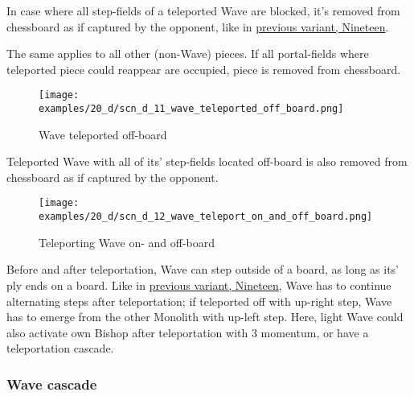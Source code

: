 In case where all step-fields of a teleported Wave are blocked, it's removed from
chessboard as if captured by the opponent, like in
\hyperref[fig:scn_n_06_teleport_wave_blocked]{previous variant, Nineteen}.

The same applies to all other (non-Wave) pieces. If all portal-fields where
teleported piece could reappear are occupied, piece is removed from chessboard.

\clearpage %

\noindent
\begin{figure}[!h]
\texttt{[image: examples/20\_d/scn\_d\_11\_wave\_teleported\_off\_board.png]}
\caption{Wave teleported off-board}
\label{fig:scn_d_11_wave_teleported_off_board}
\end{figure}

Teleported Wave with all of its' step-fields located off-board is also removed from
chessboard as if captured by the opponent.

\clearpage %

\noindent
\begin{figure}[!h]
\texttt{[image: examples/20\_d/scn\_d\_12\_wave\_teleport\_on\_and\_off\_board.png]}
\caption{Teleporting Wave on- and off-board}
\label{fig:scn_d_12_wave_teleport_on_and_off_board}
\end{figure}

Before and after teleportation, Wave can step outside of a board, as long as its' ply ends
on a board. Like in \hyperref[fig:scn_n_08_teleport_wave_end]{previous variant, Nineteen},
Wave has to continue alternating steps after teleportation; if teleported off with up-right
step, Wave has to emerge from the other Monolith with up-left step. Here, light Wave could
also activate own Bishop after teleportation with 3 momentum, or have a teleportation cascade.

\clearpage %

\subsubsection*{Wave cascade}

